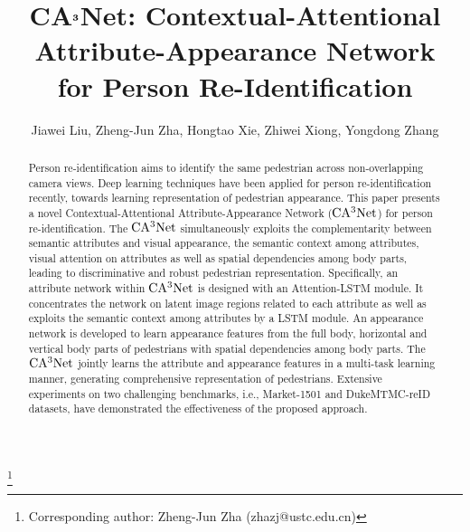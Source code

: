 \documentclass[sigconf]{acmart}
\begin{document}
\title{CA$\bf{^3}$Net: Contextual-Attentional Attribute-Appearance Network \\ for Person Re-Identification}


\author{Jiawei Liu, Zheng-Jun Zha, Hongtao Xie, Zhiwei Xiong, Yongdong Zhang}


\thanks{Corresponding author: Zheng-Jun Zha (zhazj@ustc.edu.cn)}
%
%
%

\renewcommand{\shortauthors}{Jiawei Liu et al.}


\begin{abstract}
Person re-identification aims to identify the same pedestrian across non-overlapping camera views. Deep learning techniques have been applied for person re-identification recently, towards learning representation of pedestrian appearance. This paper presents a novel Contextual-Attentional Attribute-Appearance Network ($\rm CA^3Net$) for person re-identification. The $\rm CA^3Net$ simultaneously exploits the complementarity between semantic attributes and visual appearance, the semantic context among attributes, visual attention on attributes as well as spatial dependencies among body parts, leading to discriminative and robust pedestrian representation. Specifically, an attribute network within $\rm CA^3Net$ is designed with an Attention-LSTM module. It concentrates the network on latent image regions related to each attribute as well as exploits the semantic context among attributes by a LSTM module. An appearance network is developed to learn appearance features from the full body, horizontal and vertical body parts of pedestrians with spatial dependencies among body parts. The $\rm CA^3Net$ jointly learns the attribute and appearance features in a multi-task learning manner, generating comprehensive representation of pedestrians. Extensive experiments on two challenging benchmarks, i.e., Market-1501 and DukeMTMC-reID datasets, have demonstrated the effectiveness of the proposed approach.
\end{abstract}
\end{document}
